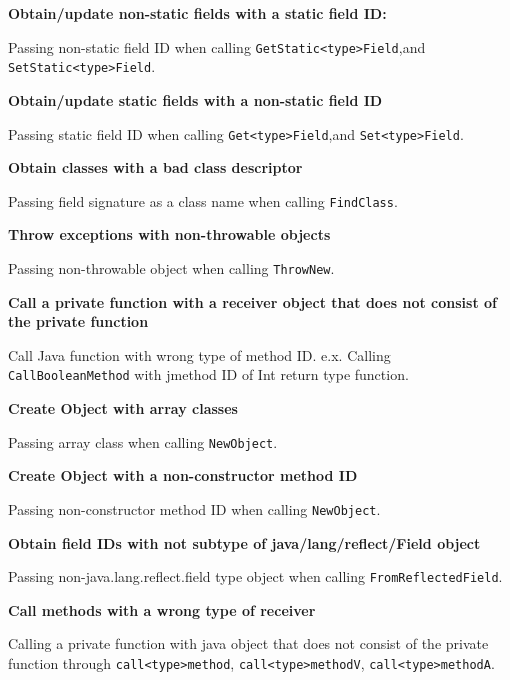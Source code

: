 \documentclass[10pt]{article}
\begin{document}
\vspace{3mm}
\noindent \textbf{Obtain/update non-static fields with a static field ID:}

Passing non-static field ID when calling {\tt GetStatic<type>Field},and {\tt SetStatic<type>Field}.

\vspace{3mm}
\noindent \textbf{Obtain/update static fields with a non-static field ID}

Passing static field ID when calling {\tt Get<type>Field},and {\tt Set<type>Field}.

\vspace{3mm}
\noindent \textbf{Obtain classes with a bad class descriptor}

Passing field signature as a class name when calling {\tt FindClass}.

\vspace{3mm}
\noindent \textbf{Throw exceptions with non-throwable objects}

Passing non-throwable object when calling {\tt ThrowNew}.

\vspace{3mm}
\noindent \textbf{Call a private function with a receiver object that does not consist of the private function}

Call Java function with wrong type of method ID.
e.x. Calling {\tt CallBooleanMethod} with jmethod ID of Int return type function.

\vspace{3mm}
\noindent \textbf{Create Object with array classes}

Passing array class when calling {\tt NewObject}.

\vspace{3mm}
\noindent \textbf{Create Object with a non-constructor method ID}

Passing non-constructor method ID when calling {\tt NewObject}.

\vspace{3mm}
\noindent \textbf{Obtain field IDs with not subtype of java/lang/reflect/Field object}

Passing non-java.lang.reflect.field type object when calling {\tt FromReflectedField}.

\vspace{3mm}
\noindent \textbf{Call methods with a wrong type of receiver}

Calling a private function with java object that does not consist of the private function through {\tt call<type>method}, {\tt call<type>methodV}, {\tt call<type>methodA}.
\end{document}
